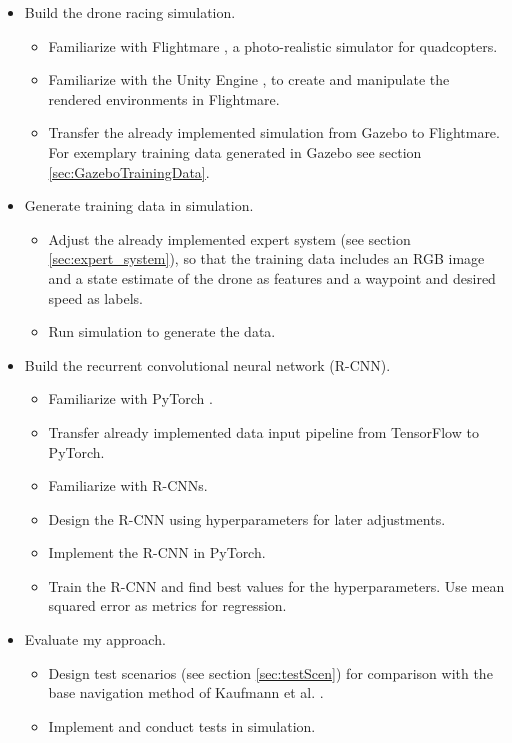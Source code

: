 \begin{itemize}
	\item Build the drone racing simulation.
	\begin{itemize}
		\item Familiarize with Flightmare \cite{song2020flightmare}, a photo-realistic simulator for quadcopters.
		\item Familiarize with the Unity Engine \cite{Unity}, to create and manipulate the rendered environments in Flightmare.
		\item Transfer the already implemented simulation from Gazebo \cite{Koenig2004} to Flightmare. For exemplary training data generated in Gazebo see section \ref{sec:GazeboTrainingData}.
	\end{itemize}
	\item Generate training data in simulation.
	\begin{itemize}
		\item Adjust the already implemented expert system (see section \ref{sec:expert_system}), so that the training data includes
		an RGB image and a state estimate of the drone as features and a waypoint and desired speed as labels.
		\item Run simulation to generate the data.
	\end{itemize}
	\item Build the recurrent convolutional neural network (R-CNN).
	\begin{itemize}
		\item Familiarize with PyTorch \cite{NEURIPS2019_9015}.
		\item Transfer already implemented data input pipeline from TensorFlow \cite{tensorflow2015-whitepaper} to PyTorch.
		\item Familiarize with R-CNNs.
		\item Design the R-CNN using hyperparameters for later adjustments.
		\item Implement the R-CNN in PyTorch.
		\item Train the R-CNN and find best values for the hyperparameters. Use mean squared error as metrics for regression.
	\end{itemize}
	\item Evaluate my approach.
	\begin{itemize}
		\item Design test scenarios (see section \ref{sec:testScen}) for comparison with the base navigation method of Kaufmann et al. \cite{Kaufmann2018}.
		\item Implement and conduct tests in simulation. 

\end{itemize}
\end{itemize}
